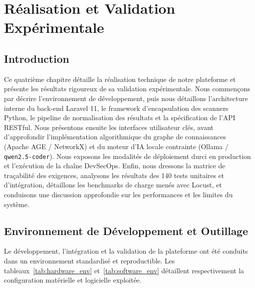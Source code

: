 \chapter{R\'ealisation et Validation Exp\'erimentale}
\label{chap:realisation}

\section*{Introduction}
\par Ce quatri\`eme chapitre d\'etaille la r\'ealisation technique de notre plateforme et pr\'esente les r\'esultats rigoureux de sa validation exp\'erimentale. Nous commen\c{c}ons par d\'ecrire l'environnement de d\'eveloppement, puis nous d\'etaillons l'architecture interne du back-end Laravel 11, le framework d'encapsulation des scanners Python, le pipeline de normalisation des r\'esultats et la sp\'ecification de l'API RESTful. Nous pr\'esentons ensuite les interfaces utilisateur cl\'es, avant d'approfondir l'impl\'ementation algorithmique du graphe de connaissances (Apache AGE / NetworkX) et du moteur d'IA locale contrainte (Ollama / \texttt{qwen2.5-coder}). Nous exposons les modalit\'es de d\'eploiement durci en production et l'ex\'ecution de la cha\^ine DevSecOps. Enfin, nous dressons la matrice de tra\c{c}abilit\'e des exigences, analysons les r\'esultats des 140 tests unitaires et d'int\'egration, d\'etaillons les benchmarks de charge men\'es avec Locust, et conduisons une discussion approfondie sur les performances et les limites du syst\`eme.

\section{Environnement de D\'eveloppement et Outillage}
\par Le d\'eveloppement, l'int\'egration et la validation de la plateforme ont \'et\'e conduits dans un environnement standardis\'e et reproductible. Les tableaux~\ref{tab:hardware_env} et~\ref{tab:software_env} d\'etaillent respectivement la configuration mat\'erielle et logicielle exploit\'ee.

